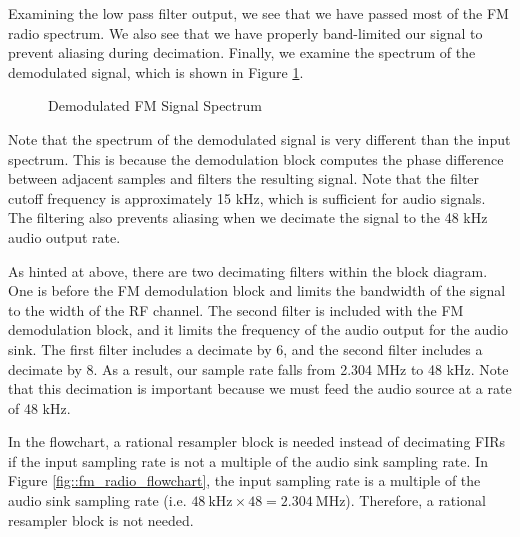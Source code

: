 \documentclass{article}
\begin{document}
\noindent Examining the low pass filter output, we see that we have passed most of the FM radio spectrum. We also see that we have properly band-limited our signal to prevent aliasing during decimation. Finally, we examine the spectrum of the demodulated signal, which is shown in Figure \ref{fig::fm_radio_demod_spectrum}.

\begin{figure}[H]
	\centerline{}
	\caption{Demodulated FM Signal Spectrum}
	\label{fig::fm_radio_demod_spectrum}
\end{figure}

\noindent Note that the spectrum of the demodulated signal is very different than the input spectrum. This is because the demodulation block computes the phase difference between adjacent samples and filters the resulting signal. Note that the filter cutoff frequency is approximately 15 kHz, which is sufficient for audio signals. The filtering also prevents aliasing when we decimate the signal to the 48 kHz audio output rate.

As hinted at above, there are two decimating filters within the block diagram. One is before the FM demodulation block and limits the bandwidth of the signal to the width of the RF channel. The second filter is included with the FM demodulation block, and it limits the frequency of the audio output for the audio sink. The first filter includes a decimate by 6, and the second filter includes a decimate by 8. As a result, our sample rate falls from 2.304 MHz to 48 kHz. Note that this decimation is important because we must feed the audio source at a rate of 48 kHz.

In the flowchart, a rational resampler block is needed instead of decimating FIRs if the input sampling rate is not a multiple of the audio sink sampling rate. In Figure \ref{fig::fm_radio_flowchart}, the input sampling rate is a multiple of the audio sink sampling rate (i.e. $48\ \text{kHz} \times 48 = 2.304\ \text{MHz}$). Therefore, a rational resampler block is not needed.
\end{document}
